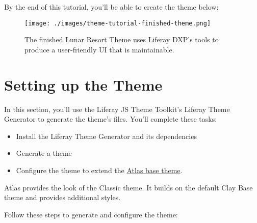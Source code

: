 By the end of this tutorial, you'll be able to create the theme below:

\begin{figure}
\centering
\texttt{[image: ./images/theme-tutorial-finished-theme.png]}
\caption{The finished Lunar Resort Theme uses Liferay DXP's tools to
produce a user-friendly UI that is maintainable.}
\end{figure}

\chapter{Setting up the Theme}\label{setting-up-the-theme}

In this section, you'll use the Liferay JS Theme Toolkit's Liferay Theme
Generator to generate the theme's files. You'll complete these tasks:

\begin{itemize}
\tightlist
\item
  Install the Liferay Theme Generator and its dependencies
\item
  Generate a theme
\item
  Configure the theme to extend the
  \href{/docs/7-2/frameworks/-/knowledge_base/f/customizing-atlas-and-clay-base-themes}{Atlas
  base theme}.
\end{itemize}

Atlas provides the look of the Classic theme. It builds on the default
Clay Base theme and provides additional styles.

Follow these steps to generate and configure the theme:

